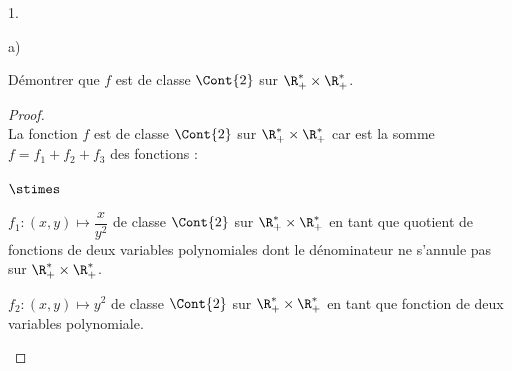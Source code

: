 \documentclass[11pt]{article}%
\begin{document}
\begin{noliste}{1.}
  \newpage


\item
  \begin{noliste}{a)}
    \setlength{\itemsep}{2mm}
  \item Démontrer que $f$ est de classe $\Cont{2}$ sur $\R_+^{*}
    \times \R_+^{*}$.
    
    \begin{proof}~\\%
      La fonction $f$ est de classe $\Cont{2}$ sur $\R_+^{*} \times
      \R_+^{*}$ car est la somme $f = f_1 + f_2 + f_3$ des fonctions :
      \begin{noliste}{$\stimes$}
      \item $f_1 : (x, y) \mapsto \dfrac{x}{y^2}$ de classe $\Cont{2}$
        sur $\R_+^{*} \times \R_+^{*}$ en tant que quotient de
        fonctions de deux variables polynomiales dont le dénominateur
        ne s'annule pas sur $\R_+^{*} \times \R_+^{*}$.

      \item $f_2 : (x, y) \mapsto y^2$ de classe $\Cont{2}$ sur
        $\R_+^{*} \times \R_+^{*}$ en tant que fonction de deux
        variables polynomiale.


\end{noliste}
\end{proof}
\end{noliste}
\end{noliste}
\end{document}
